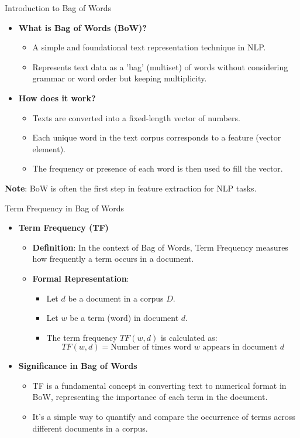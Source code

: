 \documentclass{beamer}
\newenvironment{stepitemize}{\begin{itemize}[<+->]}{\end{itemize} }
\begin{document}
\begin{frame}{Introduction to Bag of Words}

\begin{stepitemize}
\item \textbf{What is Bag of Words (BoW)?}
\begin{itemize}
  \item A simple and foundational text representation technique in NLP.
  \item Represents text data as a 'bag' (multiset) of words without considering grammar or word order but keeping multiplicity.
\end{itemize}

\item \textbf{How does it work?}
\begin{itemize}
  \item Texts are converted into a fixed-length vector of numbers.
  \item Each unique word in the text corpus corresponds to a feature (vector element).
  \item The frequency or presence of each word is then used to fill the vector.
\end{itemize}
\end{stepitemize}
\pause
\textbf{Note}: BoW is often the first step in feature extraction for NLP tasks.

\end{frame}

\begin{frame}{Term Frequency in Bag of Words}
\small
\begin{stepitemize}
\item \textbf{Term Frequency (TF)}
\begin{itemize}
  \item \textbf{Definition}: In the context of Bag of Words, Term Frequency measures how frequently a term occurs in a document.
  \item \textbf{Formal Representation}:
    \begin{itemize}
      \item Let \( d \) be a document in a corpus \( D \).
      \item Let \( w \) be a term (word) in document \( d \).
      \item The term frequency \( TF(w, d) \) is calculated as:
      \[ TF(w, d) = \text{Number of times word } w \text{ appears in document } d \]
    \end{itemize}
\end{itemize}

\item \textbf{Significance in Bag of Words}
\begin{itemize}
  \item TF is a fundamental concept in converting text to numerical format in BoW, representing the importance of each term in the document.
  \item It's a simple way to quantify and compare the occurrence of terms across different documents in a corpus.
\end{itemize}
\end{stepitemize}
\end{frame}
\end{document}
